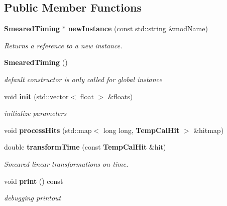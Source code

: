 \subsection*{Public Member Functions}
\begin{DoxyCompactItemize}
\item 
{\bf Smeared\-Timing} $\ast$ {\bf new\-Instance} (const std\-::string \&mod\-Name)\label{classdigisim_1_1SmearedTiming_a100c03fd016ab2747ef91ca484e86ac5}

\begin{DoxyCompactList}\small\item\em Returns a reference to a new instance. \end{DoxyCompactList}\item 
{\bf Smeared\-Timing} ()\label{classdigisim_1_1SmearedTiming_ad1de97af7e1f49556c31f9761a7251f9}

\begin{DoxyCompactList}\small\item\em default constructor is only called for global instance \end{DoxyCompactList}\item 
void {\bf init} (std\-::vector$<$ float $>$ \&floats)\label{classdigisim_1_1SmearedTiming_a7dcecdda4d162208887cc59df10235a0}

\begin{DoxyCompactList}\small\item\em initialize parameters \end{DoxyCompactList}\item 
void {\bfseries process\-Hits} (std\-::map$<$ long long, {\bf Temp\-Cal\-Hit} $>$ \&hitmap)\label{classdigisim_1_1SmearedTiming_ac39257e23e67cb167164cdf27a53d9b0}

\item 
double {\bf transform\-Time} (const {\bf Temp\-Cal\-Hit} \&hit)\label{classdigisim_1_1SmearedTiming_ac061272e8d099d7448b636b691af7db2}

\begin{DoxyCompactList}\small\item\em Smeared linear transformations on time. \end{DoxyCompactList}\item 
void {\bf print} () const \label{classdigisim_1_1SmearedTiming_aa801b4cb37d9cd384a0f3698e2f5aa9d}

\begin{DoxyCompactList}\small\item\em debugging printout \end{DoxyCompactList}\end{DoxyCompactItemize}
